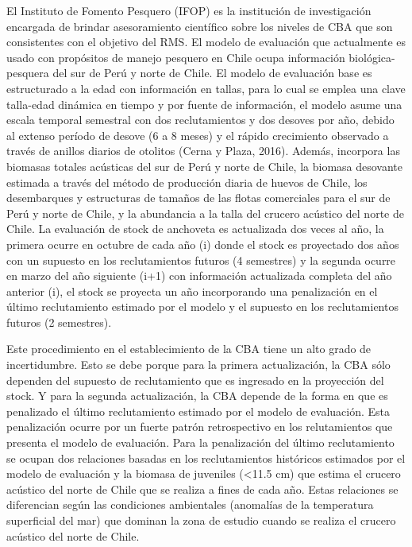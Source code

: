 
El Instituto de Fomento Pesquero (IFOP) es la institución de investigación encargada de brindar asesoramiento científico sobre los niveles de CBA que son consistentes con el objetivo del RMS. El modelo de evaluación que actualmente es usado con propósitos de manejo pesquero en Chile ocupa información biológica-pesquera del sur de Perú y norte de Chile. El modelo de evaluación base es estructurado a la edad con información en tallas, para lo cual se emplea una clave talla-edad dinámica en tiempo y por fuente de información, el modelo asume una escala temporal semestral con dos reclutamientos y dos desoves por año, debido al extenso período de desove (6 a 8 meses) y el rápido crecimiento observado a través de anillos diarios de otolitos (Cerna y Plaza, 2016). Además, incorpora las biomasas totales acústicas del sur de Perú y norte de Chile, la biomasa desovante estimada a través del método de producción diaria de huevos de Chile, los desembarques y estructuras de tamaños de las flotas comerciales para el sur de Perú y norte de Chile, y la abundancia a la talla del crucero acústico del norte de Chile. La evaluación de stock de anchoveta es actualizada dos veces al año, la primera ocurre en octubre de cada año (i) donde el stock es proyectado dos años con un supuesto en los reclutamientos futuros (4 semestres) y la segunda ocurre en marzo del año siguiente (i+1) con información actualizada completa del año anterior (i), el stock se proyecta un año incorporando una penalización en el último reclutamiento estimado por el modelo y el supuesto en los reclutamientos futuros (2 semestres).
\newline

Este procedimiento en el establecimiento de la CBA tiene un alto grado de incertidumbre. Esto se debe porque para la primera actualización, la CBA sólo dependen del supuesto de reclutamiento que es ingresado en la proyección del stock. Y para la segunda actualización, la CBA depende de la forma en que es penalizado el último reclutamiento estimado por el modelo de evaluación. Esta penalización ocurre por un fuerte patrón retrospectivo en los relutamientos que presenta el modelo de evaluación. Para la penalización del último reclutamiento se ocupan dos relaciones basadas en los reclutamientos históricos estimados por el modelo de evaluación y la biomasa de juveniles (<11.5 cm) que estima el crucero acústico del norte de Chile que se realiza a fines de cada año. Estas relaciones se diferencian según las condiciones ambientales (anomalías de la temperatura superficial del mar) que dominan la zona de estudio cuando se realiza el crucero acústico del norte de Chile.
\newline

